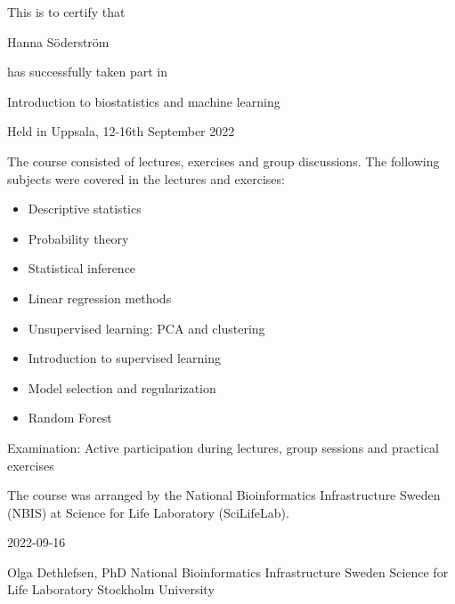 \documentclass[12pt]{article}\usepackage[]{graphicx}\usepackage[]{color}
\newcommand{\courseName}{Introduction to biostatistics and machine learning}
\newcommand{\courseLocation}{in Uppsala}
\newcommand{\courseDate}{12-16th September 2022}
\newcommand{\courseLastDay}{2022-09-16}
\newcommand{\courseExaminer}{Olga Dethlefsen, PhD}
\begin{document}
\large
This is to certify that 


\LARGE
Hanna Söderström

\large
has successfully taken part in \newline

\LARGE
\begin{center}{\courseName}  \end{center} 


\large
\begin{center} Held  {\courseLocation}, {\courseDate} \end{center} 

\vspace{5mm}
\normalsize
The course consisted of lectures, exercises and group discussions. The following subjects were covered in the lectures and exercises:
\begin{itemize}
  \item Descriptive statistics 
  \item Probability theory
  \item Statistical inference
  \item Linear regression methods
  \item Unsupervised learning: PCA and clustering
  \item Introduction to supervised learning 
  \item Model selection and regularization
  \item Random Forest
\end{itemize}


\vspace{5mm}
Examination: \newline
Active participation during lectures, group sessions and practical exercises

\vspace{8mm}
The course was arranged by the National Bioinformatics Infrastructure Sweden (NBIS) at Science for Life Laboratory (SciLifeLab).


\vspace{8mm}
 {\courseLastDay}
\vspace{22mm}


{\courseExaminer} \newline
\small
National Bioinformatics Infrastructure Sweden \newline
Science for Life Laboratory \newline
Stockholm University \newline
\end{document}
